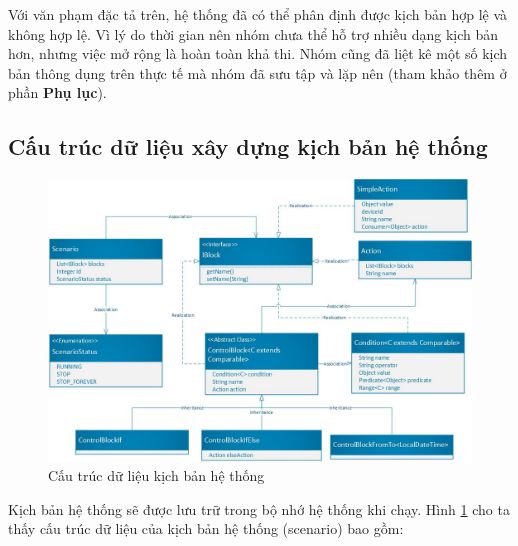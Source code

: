 \documentclass[12pt,a4paper,oneside]{extbook}
\begin{document}
Với văn phạm đặc tả trên, hệ thống đã có thể phân định được kịch bản hợp lệ và không hợp lệ. Vì lý do thời gian nên nhóm chưa thể hỗ trợ nhiều dạng kịch bản hơn, nhưng việc mở rộng là hoàn toàn khả thi. Nhóm cũng đã liệt kê một số kịch bản thông dụng trên thực tế mà nhóm đã sưu tập và lặp nên (tham khảo thêm ở phần \textbf{Phụ lục}).

\subsection{Cấu trúc dữ liệu xây dựng kịch bản hệ thống}\label{grammar-data-structure}

\begin{figure}[h]
  \centering
    \includegraphics[width=15cm]{6-data-structure-scenario}
  \caption{Cấu trúc dữ liệu kịch bản hệ thống}\label{fig:6-data-structure-scenario}
\end{figure}

Kịch bản hệ thống sẽ được lưu trữ trong bộ nhớ hệ thống khi chạy. Hình \ref{fig:6-data-structure-scenario} cho ta thấy cấu trúc dữ liệu của kịch bản hệ thống (scenario) bao gồm:
\end{document}
